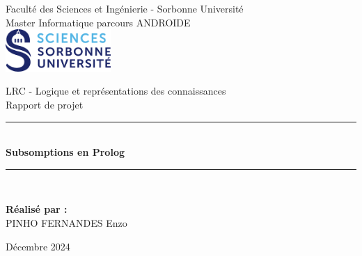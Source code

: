 \documentclass[a4paper,12pt]{report}
\begin{document}

\begin{titlepage}
    \centering


    {\large Faculté des Sciences et Ingénierie - Sorbonne Université}\\[0.3cm]
    {\large Master Informatique parcours ANDROIDE}\\[1cm]
    \includegraphics[width=0.3\textwidth]{./images/logo_SU.png}\\[1.5cm]



    \vspace{1.5cm}

    {\LARGE LRC - Logique et représentations des connaissances}\\[1cm]
    {\Large Rapport de projet}\\[2cm]
    \rule{\linewidth}{0.5mm} \\[1cm]
    {\Huge \textbf{Subsomptions en Prolog}} \\[0.4cm]
    \rule{\linewidth}{0.5mm} \\[2cm]
    


    \begin{flushleft}
        \textbf{Réalisé par :} \\[0.3cm]
        PINHO FERNANDES Enzo \\[0.2cm]
    \end{flushleft}
    


    \vfill
    {\large Décembre 2024}\\
    
\end{titlepage}
\end{document}
